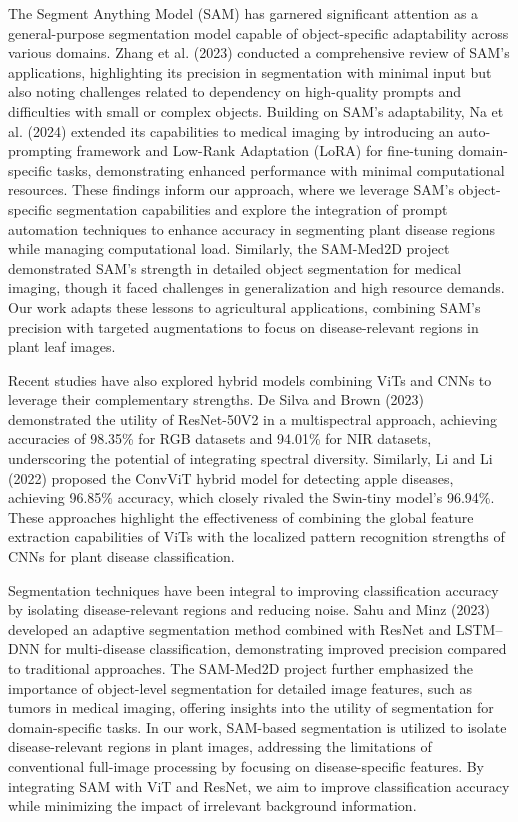 \documentclass{article}
\begin{document}
The Segment Anything Model (SAM) has garnered significant attention as a general-purpose segmentation model capable of object-specific adaptability across various domains. Zhang et al. (2023) conducted a comprehensive review of SAM’s applications, highlighting its precision in segmentation with minimal input but also noting challenges related to dependency on high-quality prompts and difficulties with small or complex objects. Building on SAM’s adaptability, Na et al. (2024) extended its capabilities to medical imaging by introducing an auto-prompting framework and Low-Rank Adaptation (LoRA) for fine-tuning domain-specific tasks, demonstrating enhanced performance with minimal computational resources. These findings inform our approach, where we leverage SAM’s object-specific segmentation capabilities and explore the integration of prompt automation techniques to enhance accuracy in segmenting plant disease regions while managing computational load. Similarly, the SAM-Med2D project demonstrated SAM’s strength in detailed object segmentation for medical imaging, though it faced challenges in generalization and high resource demands. Our work adapts these lessons to agricultural applications, combining SAM’s precision with targeted augmentations to focus on disease-relevant regions in plant leaf images.

Recent studies have also explored hybrid models combining ViTs and CNNs to leverage their complementary strengths. De Silva and Brown (2023) demonstrated the utility of ResNet-50V2 in a multispectral approach, achieving accuracies of 98.35\% for RGB datasets and 94.01\% for NIR datasets, underscoring the potential of integrating spectral diversity. Similarly, Li and Li (2022) proposed the ConvViT hybrid model for detecting apple diseases, achieving 96.85\% accuracy, which closely rivaled the Swin-tiny model's 96.94\%. These approaches highlight the effectiveness of combining the global feature extraction capabilities of ViTs with the localized pattern recognition strengths of CNNs for plant disease classification.

Segmentation techniques have been integral to improving classification accuracy by isolating disease-relevant regions and reducing noise. Sahu and Minz (2023) developed an adaptive segmentation method combined with ResNet and LSTM–DNN for multi-disease classification, demonstrating improved precision compared to traditional approaches. The SAM-Med2D project further emphasized the importance of object-level segmentation for detailed image features, such as tumors in medical imaging, offering insights into the utility of segmentation for domain-specific tasks. In our work, SAM-based segmentation is utilized to isolate disease-relevant regions in plant images, addressing the limitations of conventional full-image processing by focusing on disease-specific features. By integrating SAM with ViT and ResNet, we aim to improve classification accuracy while minimizing the impact of irrelevant background information.
\end{document}
